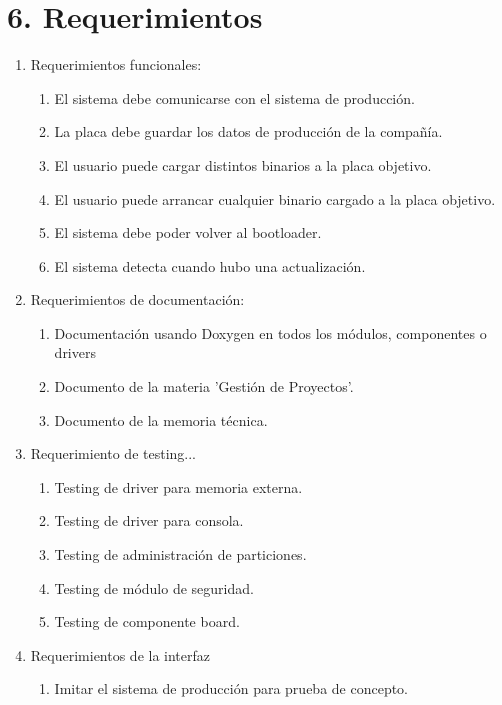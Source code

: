 \documentclass[
11pt, %
]{charter}
\begin{document}
\section{6. Requerimientos}
\label{sec:requerimientos}

\begin{enumerate}
	\item Requerimientos funcionales:
		\begin{enumerate}
			
			\item El sistema debe comunicarse con el sistema de producción.
			\item La placa debe guardar los datos de producción de la compañía.
			\item El usuario puede cargar distintos binarios a la placa objetivo.
			\item El usuario puede arrancar cualquier binario cargado a la placa objetivo.
			\item El sistema debe poder volver al bootloader.
			\item El sistema detecta cuando hubo una actualización.
		\end{enumerate}
	\item Requerimientos de documentación:
		\begin{enumerate}
			\item Documentación usando Doxygen en todos los módulos, componentes o drivers
			\item Documento de la materia 'Gestión de Proyectos'.
			\item Documento de la memoria técnica.
		\end{enumerate}
	\item Requerimiento de testing...
		\begin{enumerate}
			\item Testing de driver para memoria externa.
			\item Testing de driver para consola.
			\item Testing de administración de particiones.
			\item Testing de módulo de seguridad.
			\item Testing de componente board.
		\end{enumerate}
	\item Requerimientos de la interfaz
		\begin{enumerate}
			\item Imitar el sistema de producción para prueba de concepto.
		\end{enumerate}
\end{enumerate}
\end{document}

